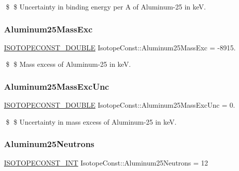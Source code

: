 \$ \$ Uncertainty in binding energy per A of Aluminum-\/25 in keV. \mbox{\label{group___isotope_const-_aluminum-_al25_ga2b90cf3130bdef737dad092cfc2370bb}} 
\subsubsection{\texorpdfstring{Aluminum25\+Mass\+Exc}{Aluminum25MassExc}}
{\footnotesize\ttfamily \mbox{\hyperlink{group___isotope_const-_macros_ga8f45a7272ce02c0b4c65c44636ed719a}{I\+S\+O\+T\+O\+P\+E\+C\+O\+N\+S\+T\+\_\+\+D\+O\+U\+B\+LE}} Isotope\+Const\+::\+Aluminum25\+Mass\+Exc = -\/8915.}

\$ \$ Mass excess of Aluminum-\/25 in keV. \mbox{\label{group___isotope_const-_aluminum-_al25_ga259fb87eb2e17c267b2c95d37c6ce968}} 
\subsubsection{\texorpdfstring{Aluminum25\+Mass\+Exc\+Unc}{Aluminum25MassExcUnc}}
{\footnotesize\ttfamily \mbox{\hyperlink{group___isotope_const-_macros_ga8f45a7272ce02c0b4c65c44636ed719a}{I\+S\+O\+T\+O\+P\+E\+C\+O\+N\+S\+T\+\_\+\+D\+O\+U\+B\+LE}} Isotope\+Const\+::\+Aluminum25\+Mass\+Exc\+Unc = 0.}

\$ \$ Uncertainty in mass excess of Aluminum-\/25 in keV. \mbox{\label{group___isotope_const-_aluminum-_al25_ga9874591d230f31ceb8ca47f43e6849d2}} 
\subsubsection{\texorpdfstring{Aluminum25\+Neutrons}{Aluminum25Neutrons}}
{\footnotesize\ttfamily \mbox{\hyperlink{group___isotope_const-_macros_ga5f18360b3e99483a35c32d789e62621c}{I\+S\+O\+T\+O\+P\+E\+C\+O\+N\+S\+T\+\_\+\+I\+NT}} Isotope\+Const\+::\+Aluminum25\+Neutrons = 12}

